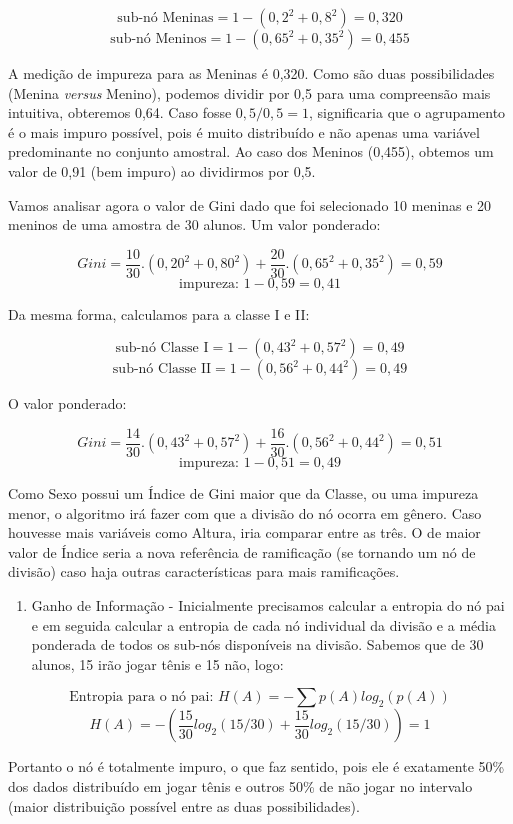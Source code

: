 \documentclass[
  openany]{book}
\providecommand{\tightlist}{%
  \setlength{\itemsep}{0pt}\setlength{\parskip}{0pt}}
\begin{document}
\[\mbox{sub-nó Meninas}= 1 -(0,2^2+0,8^2)=0,320\]
\[\mbox{sub-nó Meninos}= 1 -(0,65^2+0,35^2)=0,455\]

A medição de impureza para as Meninas é 0,320. Como são duas possibilidades (Menina \emph{versus} Menino), podemos dividir por 0,5 para uma compreensão mais intuitiva, obteremos 0,64. Caso fosse \(0,5 / 0,5 = 1\), significaria que o agrupamento é o mais impuro possível, pois é muito distribuído e não apenas uma variável predominante no conjunto amostral. Ao caso dos Meninos (0,455), obtemos um valor de 0,91 (bem impuro) ao dividirmos por 0,5.

Vamos analisar agora o valor de Gini dado que foi selecionado 10 meninas e 20 meninos de uma amostra de 30 alunos. Um valor ponderado:

\[Gini=\frac{10}{30}.(0,20^2+0,80^2)+\frac{20}{30}.(0,65^2+0,35^2)=0,59\]
\[\mbox{impureza: }1-0,59=0,41\]

Da mesma forma, calculamos para a classe I e II:

\[\mbox{sub-nó Classe I}= 1 -(0,43^2+0,57^2)=0,49\]
\[\mbox{sub-nó Classe II}= 1 -(0,56^2+0,44^2)=0,49\]

O valor ponderado:

\[Gini=\frac{14}{30}.(0,43^2+0,57^2)+\frac{16}{30}.(0,56^2+0,44^2)=0,51\]
\[\mbox{impureza: }1-0,51=0,49\]

Como Sexo possui um Índice de Gini maior que da Classe, ou uma impureza menor, o algoritmo irá fazer com que a divisão do nó ocorra em gênero. Caso houvesse mais variáveis como Altura, iria comparar entre as três. O de maior valor de Índice seria a nova referência de ramificação (se tornando um nó de divisão) caso haja outras características para mais ramificações.

\begin{enumerate}
\def\labelenumi{\arabic{enumi}.}
\setcounter{enumi}{1}
\tightlist
\item
  Ganho de Informação - Inicialmente precisamos calcular a entropia do nó pai e em seguida calcular a entropia de cada nó individual da divisão e a média ponderada de todos os sub-nós disponíveis na divisão. Sabemos que de 30 alunos, 15 irão jogar tênis e 15 não, logo:
\end{enumerate}

\[\mbox{Entropia para o nó pai: } H(A)=- \sum p(A)log_2(p(A))\]
\[H(A)=-(\frac{15}{30}log_2(15/30)+\frac{15}{30}log_2(15/30))=1\]

Portanto o nó é totalmente impuro, o que faz sentido, pois ele é exatamente 50\% dos dados distribuído em jogar tênis e outros 50\% de não jogar no intervalo (maior distribuição possível entre as duas possibilidades).
\end{document}
